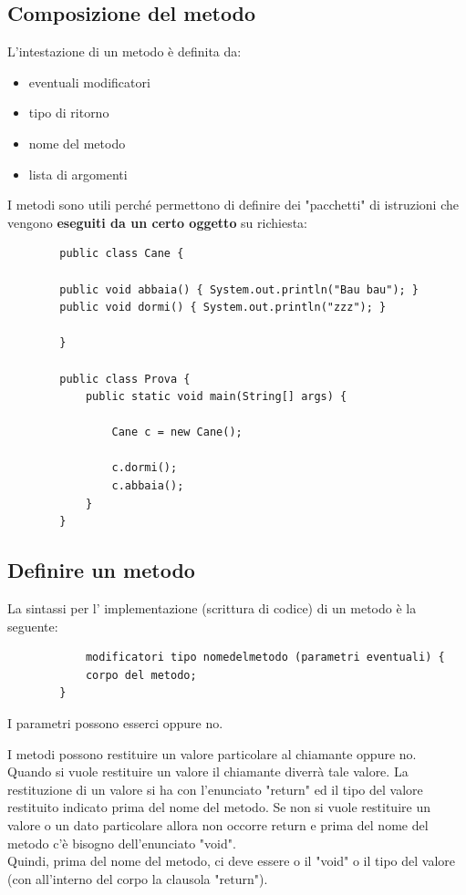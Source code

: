 \documentclass[a4paper,12 pt]{article}
\begin{document}
	\subsection{Composizione del metodo}
		L'intestazione di un metodo è definita da:
		\begin{itemize}
			\item eventuali modificatori
			\item tipo di ritorno
			\item nome del metodo
			\item lista di argomenti
		\end{itemize}
		I metodi sono utili perché permettono di definire dei "pacchetti" di istruzioni che vengono \textbf{eseguiti da un certo oggetto} su richiesta:
		
		\begin{lstlisting}
		public class Cane {
			
		public void abbaia() { System.out.println("Bau bau"); }
		public void dormi() { System.out.println("zzz"); }
			
		}
		
		public class Prova {
			public static void main(String[] args) {
			
			 	Cane c = new Cane();
			 	
				c.dormi();
				c.abbaia();
			}
		}
		\end{lstlisting}
	\subsection{Definire un metodo}
		La sintassi per l' implementazione (scrittura di codice) di un metodo è la seguente:
		\begin{lstlisting}
			modificatori tipo nomedelmetodo (parametri eventuali) {
			corpo del metodo;
		}
		\end{lstlisting}
		
		I parametri possono esserci oppure no.
		
		\noindent I metodi possono restituire un valore particolare al chiamante oppure no.\\ Quando si vuole restituire un valore il chiamante diverrà tale valore. La restituzione di un valore si ha con l'enunciato "return" ed il tipo del valore restituito indicato prima del nome del metodo. Se non si vuole restituire un valore o un dato particolare allora non occorre return e prima del nome del metodo c'è bisogno dell'enunciato "void". \\ Quindi, prima del nome del metodo, ci deve essere o il "void" o il tipo del valore (con all'interno del corpo la clausola "return").
		
\end{document}
